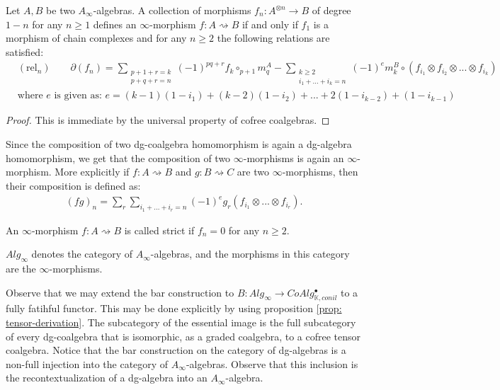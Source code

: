 \documentclass[../thesis.tex]{subfiles}
\begin{document}
        \begin{proposition}
            Let $A,B$ be two $A_\infty$-algebras. A collection of morphisms $f_n : A^{\otimes n} \rightarrow B$ of degree $1-n$ for any $n \geq 1$ defines an $\infty$-morphism $f : A \rightsquigarrow B$ if and only if $f_1$ is a morphism of chain complexes and for any $n\geq 2$ the following relations are satisfied:
            \begin{align*}
                & (\text{rel}_n)\qquad \partial(f_n) = \sum_{\substack{p + 1 + r = k \\ p + q + r = n}}(-1)^{pq+r}f_k\circ_{p+1}m^A_q - \sum_{\substack{k\geq 2 \\ i_1 + ... + i_k = n}}(-1)^{e}m^B_k \circ (f_{i_1}\otimes f_{i_2}\otimes ... \otimes f_{i_k}) \\
                & \text{where } e \text{ is given as: } e = (k-1)(1-i_1) + (k-2)(1-i_2) + ... + 2(1-i_{k-2}) + (1-i_{k-1})
            \end{align*}
        \end{proposition}
        
        \begin{proof}
            This is immediate by the universal property of cofree coalgebras.
        \end{proof}

        Since the composition of two dg-coalgebra homomorphism is again a dg-algebra homomorphism, we get that the composition of two $\infty$-morphisms is again an $\infty$-morphism. More explicitly if $f:A\rightsquigarrow B$ and $g: B\rightsquigarrow C$ are two $\infty$-morphisms, then their composition is defined as:
        \begin{align*}
            (fg)_n = \sum_r\sum_{i_1 + ... + i_r = n} (-1)^eg_r(f_{i_1}\otimes ... \otimes f_{i_r})\text{.}
        \end{align*}

        \begin{definition}
            An $\infty$-morphism $f: A\rightsquigarrow B$ is called strict if $f_n = 0$ for any $n\geq 2$. 
        \end{definition}

        \begin{definition}
            $Alg_\infty$ denotes the category of $A_\infty$-algebras, and the morphisms in this category are the $\infty$-morphisms.
        \end{definition}

        Observe that we may extend the bar construction to $B : Alg_\infty \rightarrow CoAlg_{\mathbb{K},conil}^\bullet$ to a fully fatihful functor. This may be done explicitly by using proposition \ref{prop: tensor-derivation}. The subcategory of the essential image is the full subcategory of every dg-coalgebra that is isomorphic, as a graded coalgebra, to a cofree tensor coalgebra. Notice that the bar construction on the category of dg-algebras is a non-full injection into the category of $A_\infty$-algebras. Observe that this inclusion is the recontextualization of a dg-algebra into an $A_\infty$-algebra.
\end{document}
